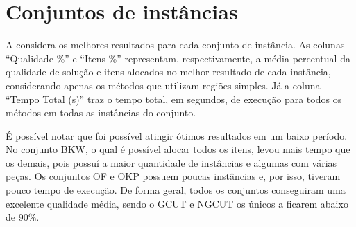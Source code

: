 \section{Conjuntos de instâncias}\label{sec:conjuntos-de-instancias}

A  considera os melhores resultados para cada conjunto de instância.
As colunas “Qualidade \%” e “Itens \%” representam, respectivamente, a média percentual da qualidade
de solução e itens alocados no melhor resultado de cada instância, considerando apenas os
métodos que utilizam regiões simples.
Já a coluna “Tempo Total (s)” traz o tempo total, em segundos, de execução para todos os métodos
em todas as instâncias do conjunto.



É possível notar que foi possível atingir ótimos resultados em um baixo período.
No conjunto BKW, o qual é possível alocar todos os itens, levou mais tempo que os demais, pois
possuí a maior quantidade de instâncias e algumas com várias peças.
Os conjuntos OF e OKP possuem poucas instâncias e, por isso, tiveram pouco tempo de execução.
De forma geral, todos os conjuntos conseguiram uma excelente qualidade média, sendo o GCUT e NGCUT
os únicos a ficarem abaixo de $90\%$.

